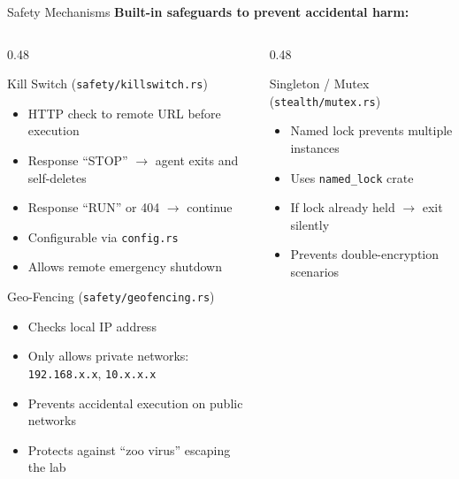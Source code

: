 \documentclass[aspectratio=169]{beamer}
\newcommand{\code}[1]{\texttt{\textcolor{primaryblue}{#1}}}
\begin{document}
\begin{frame}{Safety Mechanisms}
  \textbf{Built-in safeguards to prevent accidental harm:}

  \vspace{0.5em}
  \begin{columns}[T]
    \begin{column}{0.48\textwidth}
      \begin{block}{Kill Switch (\code{safety/killswitch.rs})}
        \footnotesize
        \begin{itemize}
          \item HTTP check to remote URL before execution
          \item Response ``STOP'' $\rightarrow$ agent exits and self-deletes
          \item Response ``RUN'' or 404 $\rightarrow$ continue
          \item Configurable via \code{config.rs}
          \item Allows remote emergency shutdown
        \end{itemize}
      \end{block}

      \vspace{0.3em}
      \begin{block}{Geo-Fencing (\code{safety/geofencing.rs})}
        \footnotesize
        \begin{itemize}
          \item Checks local IP address
          \item Only allows private networks: \code{192.168.x.x}, \code{10.x.x.x}
          \item Prevents accidental execution on public networks
          \item Protects against ``zoo virus'' escaping the lab
        \end{itemize}
      \end{block}
    \end{column}
    \begin{column}{0.48\textwidth}
      \begin{block}{Singleton / Mutex (\code{stealth/mutex.rs})}
        \footnotesize
        \begin{itemize}
          \item Named lock prevents multiple instances
          \item Uses \code{named\_lock} crate
          \item If lock already held $\rightarrow$ exit silently
          \item Prevents double-encryption scenarios
        \end{itemize}
      \end{block}


\end{column}
\end{columns}
\end{frame}
\end{document}
